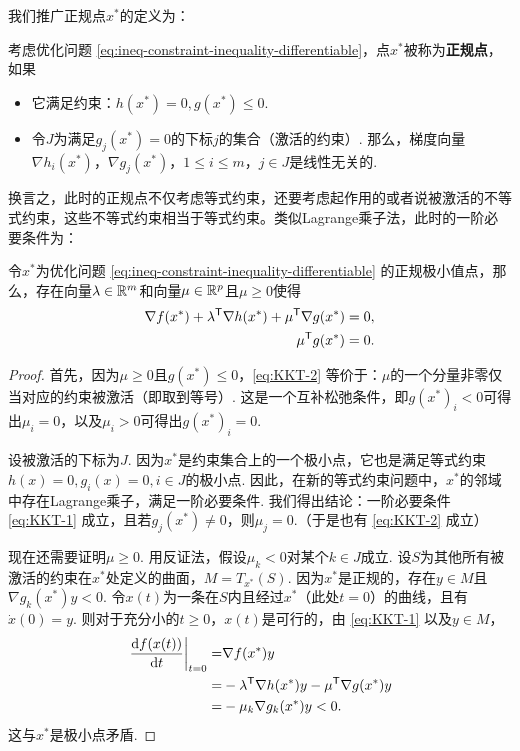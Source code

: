 我们推广正规点$x^\ast$的定义为：
\begin{definition}[正规点]
考虑优化问题 \eqref{eq:ineq-constraint-inequality-differentiable}，点$x^\ast$被称为\textbf{正规点}，如果
\begin{itemize}
    \item 它满足约束：$h(x^\ast)=0, g(x^\ast)\le 0$.
    \item 令$J$为满足$g_j({x^\ast})=0$的下标$j$的集合（激活的约束）. 那么，梯度向量$\nabla h_i({x^\ast})$，$\nabla g_j({x^\ast})$，$1\le i \le m$，$j\in J$是线性无关的.
\end{itemize}
\end{definition}

换言之，此时的正规点不仅考虑等式约束，还要考虑起作用的或者说被激活的不等式约束，这些不等式约束相当于等式约束。类似Lagrange乘子法，此时的一阶必要条件为：

\begin{theorem}\label{thm:KKT}
令${x^\ast}$为优化问题 \eqref{eq:ineq-constraint-inequality-differentiable} 的正规极小值点，那么，存在向量${\lambda}\in\mathbb{R}^m$和向量${\mu}\in \mathbb{R}^p$且${\mu\ge 0}$使得
\begin{align}
    \nabla f({x^\ast})+\lambda^{\mathsf{T}} \nabla {h(x^\ast)}+{\mu}^{\mathsf{T}} \nabla {g(x^\ast)}&={0},\label{eq:KKT-1}\\
    {\mu^{\mathsf{T}} g(x^\ast)}&=0.\label{eq:KKT-2}
\end{align}
\end{theorem}

\begin{proof}
首先，因为${\mu\ge 0}$且${g(x^\ast)\le 0}$，\eqref{eq:KKT-2} 等价于：${\mu}$的一个分量非零仅当对应的约束被激活（即取到等号）. 这是一个互补松弛条件，即${g(x^\ast)}_i<0$可得出$\mu_i=0$，以及$\mu_i>0$可得出${g(x^\ast)}_i=0.$

设被激活的下标为$J$. 因为${x^\ast}$是约束集合上的一个极小点，它也是满足等式约束$h(x)=0,g_i(x)=0,i\in J$的极小点. 因此，在新的等式约束问题中，${x^\ast}$的邻域中存在Lagrange乘子，满足一阶必要条件. 我们得出结论：一阶必要条件 \eqref{eq:KKT-1} 成立，且若$g_j({x^\ast})\neq0$，则$\mu_j=0$.（于是也有 \eqref{eq:KKT-2} 成立）

现在还需要证明${\mu \ge 0}$. 用反证法，假设$\mu_k<0$对某个$k\in J$成立. 设$S$为其他所有被激活的约束在${x^\ast}$处定义的曲面，$M=T_{x^\ast}(S)$. 因为$x^\ast$是正规的，存在${y}\in M$且$\nabla g_k({x^\ast})y<0$. 令${x}(t)$为一条在$S$内且经过${x^\ast}$（此处$t=0$）的曲线，且有$\dot{{x}}(0)={y}$. 则对于充分小的$t\ge 0$，${x}(t)$是可行的，由 \eqref{eq:KKT-1} 以及$y\in M$，
\begin{align*}
    \left.\frac{\mathrm{d} f({x}(t))}{\mathrm{d} t}\right|_{t=0}=&\nabla f({x^\ast})y\\
    =&-\lambda^{\mathsf{T}} \nabla {h(x^\ast)}y-{\mu}^{\mathsf{T}} \nabla {g(x^\ast)}y\\
    =&-\mu_k\nabla g_k({x^\ast})y<0. 
\end{align*}
这与${x^\ast}$是极小点矛盾. 
\end{proof}

